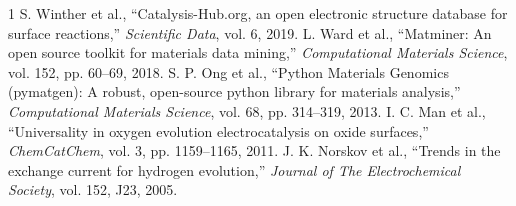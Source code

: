 \documentclass[conference]{IEEEtran}
\begin{document}
\begin{thebibliography}{1}
 S. Winther et al., ``Catalysis-Hub.org, an open electronic structure database for surface reactions,'' \emph{Scientific Data}, vol. 6, 2019.
 L. Ward et al., ``Matminer: An open source toolkit for materials data mining,'' \emph{Computational Materials Science}, vol. 152, pp. 60--69, 2018.
 S. P. Ong et al., ``Python Materials Genomics (pymatgen): A robust, open-source python library for materials analysis,'' \emph{Computational Materials Science}, vol. 68, pp. 314--319, 2013.
 I. C. Man et al., ``Universality in oxygen evolution electrocatalysis on oxide surfaces,'' \emph{ChemCatChem}, vol. 3, pp. 1159--1165, 2011.
 J. K. Norskov et al., ``Trends in the exchange current for hydrogen evolution,'' \emph{Journal of The Electrochemical Society}, vol. 152, J23, 2005.
\end{thebibliography}
\end{document}
